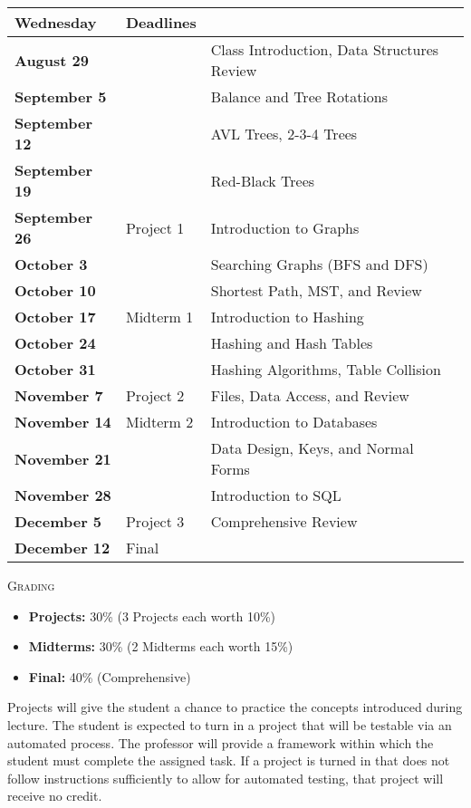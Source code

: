 \documentclass{letter}
\newcommand{\heading}[1]{{\large \textsc{#1}}}
\begin{document}
\begin{center}
  \begin{tabular}{ | l | l | l | }
    \hline
    {\bf Wednesday} & {\bf Deadlines} & \\
    \hline
    {\bf August 29} & & Class Introduction, Data Structures Review \\
    {\bf September 5} & & Balance and Tree Rotations \\
    {\bf September 12} & & AVL Trees, 2-3-4 Trees \\
    {\bf September 19} & & Red-Black Trees \\
    {\bf September 26} & Project 1 & Introduction to Graphs \\
    {\bf October 3} & & Searching Graphs (BFS and DFS) \\
    {\bf October 10} & & Shortest Path, MST, and Review \\
    {\bf October 17} & Midterm 1 & Introduction to Hashing \\
    {\bf October 24} & & Hashing and Hash Tables \\
    {\bf October 31} & & Hashing Algorithms, Table Collision \\
    {\bf November 7} & Project 2 & Files, Data Access, and Review \\
    {\bf November 14} & Midterm 2 & Introduction to Databases \\
    {\bf November 21} & & Data Design, Keys, and Normal Forms \\
    {\bf November 28} & & Introduction to SQL \\
    {\bf December 5} & Project 3 & Comprehensive Review \\
    {\bf December 12} & Final & \\
    \hline
  \end{tabular}
\end{center}

\heading{Grading}

\begin{itemize}
  \item[] {\bf Projects:} 30\% (3 Projects each worth 10\%)
  \item[] {\bf Midterms:} 30\% (2 Midterms each worth 15\%)
  \item[] {\bf Final:} 40\% (Comprehensive)
\end{itemize}

Projects will give the student a chance to practice the concepts introduced
during lecture.  The student is expected to turn in a project that will be
testable via an automated process.  The professor will provide a framework
within which the student must complete the assigned task.  If a project is
turned in that does not follow instructions sufficiently to allow for automated
testing, that project will receive no credit.
\end{document}
